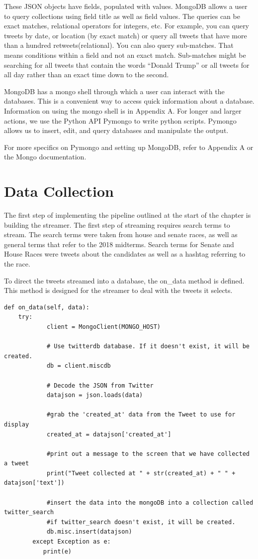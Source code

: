 \documentclass[11pt, twoside, reqno]{book}
\begin{document}
These JSON objects have fields, populated with values. MongoDB allows a user to query collections using field title as well as field values. The queries can be exact matches, relational operators for integers, etc. For example, you can query tweets by date, or location (by exact match) or query all tweets that have more than a hundred retweets(relational). You can also query sub-matches. That means conditions within a field and not an exact match. Sub-matches might be searching for all tweets that contain the words ``Donald Trump'' or all tweets for all day rather than an exact time down to the second\cite{mongo_docs}. 

MongoDB has a mongo shell through which a user can interact with the databases. This is a convenient way to access quick information about a database. Information on using the mongo shell is in Appendix A. For longer and larger actions, we use the Python API Pymongo to write python scripts. Pymongo allows us to insert, edit, and query databases and manipulate the output. 

For more specifics on Pymongo and setting up MongoDB, refer to Appendix A or the Mongo documentation\cite{mongo_docs}.

\section{Data Collection}
\hspace{0.2in} 
The first step of implementing the pipeline outlined at the start of the chapter is building the streamer. The first step of streaming requires search terms to stream. The search terms were taken from house and senate races, as well as general terms that refer to the 2018 midterms. Search terms for Senate and House Races were tweets about the candidates as well as a hashtag referring to the race. 

To direct the tweets streamed into a database, the on\_data method is defined. This method is designed for the streamer to deal with the tweets it selects.

\begin{verbatim}
def on_data(self, data):
	try:
            client = MongoClient(MONGO_HOST)

            # Use twitterdb database. If it doesn't exist, it will be created.
            db = client.miscdb

            # Decode the JSON from Twitter
            datajson = json.loads(data)

            #grab the 'created_at' data from the Tweet to use for display
            created_at = datajson['created_at']

            #print out a message to the screen that we have collected a tweet
            print("Tweet collected at " + str(created_at) + " " + datajson['text'])

            #insert the data into the mongoDB into a collection called twitter_search
            #if twitter_search doesn't exist, it will be created.
            db.misc.insert(datajson)
        except Exception as e:
           print(e)
\end{verbatim}
\end{document}
